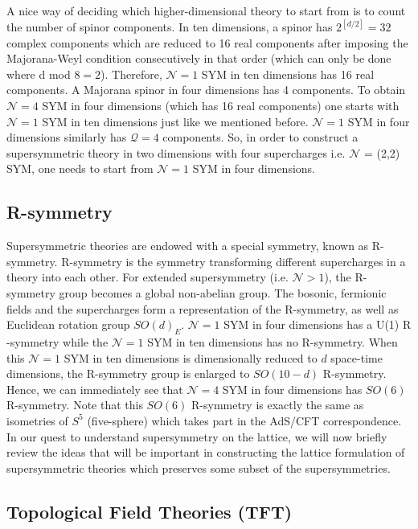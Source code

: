 A nice way of deciding which higher-dimensional theory to start from is to count the number of spinor components.  
In ten dimensions, a spinor has $2^{[d/2]} = 32$ complex components which are reduced to 16 real components
after imposing the Majorana-Weyl condition consecutively in that order (which can only be done where d mod $8 = 2$). 
Therefore, $\mathcal{N}=1$ SYM in ten dimensions has 16 real components. 
A Majorana spinor in four dimensions has 4 components. To obtain
$\mathcal{N}=4$ SYM in four dimensions (which has 16 real components) 
one starts with $\mathcal{N}=1$ SYM in ten dimensions just like we mentioned before. 
$\mathcal{N}=1$ SYM in four dimensions similarly has $\mathcal{Q}=4$ components. 
So, in order to construct a supersymmetric theory in two dimensions with four supercharges i.e. $\mathcal{N}$ = (2,2) SYM, 
one needs to start from $\mathcal{N}=1$ SYM in four dimensions. 


\subsection{R-symmetry} 

Supersymmetric theories are endowed with a special symmetry, known as R-symmetry. 
R-symmetry is the symmetry transforming different supercharges in a theory into each other. 
For extended supersymmetry (i.e. $\mathcal{N} > 1$), the R-symmetry group becomes a 
global non-abelian group. The bosonic, fermionic fields and the supercharges form a representation of the 
R-symmetry, as well as Euclidean rotation group $SO(d)_{E}$.
$\mathcal{N}=1$ SYM in four dimensions has a U(1) R
-symmetry while the $\mathcal{N}=1$
SYM in ten dimensions has no R-symmetry. 
When this $\mathcal{N}=1$ SYM in ten dimensions is dimensionally reduced to $d$ space-time 
dimensions, the R-symmetry group is enlarged to $SO(10-d)$ R-symmetry. Hence, we can immediately 
see that $\mathcal{N}=4$ SYM in four dimensions has $SO(6)$ R-symmetry.
Note that this $SO(6)$ R-symmetry is exactly the same as isometries of $S^{5}$ (five-sphere) 
which takes part in the AdS/CFT correspondence. 
In our quest to understand supersymmetry on the lattice, we will now briefly review
the ideas that will be important in constructing the lattice formulation of supersymmetric theories
which preserves some subset of the supersymmetries. 



\subsection{Topological Field Theories (TFT)}

